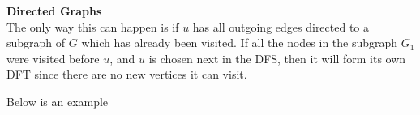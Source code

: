 \documentclass[11pt]{article}
\begin{document}
\begin{solution} \textbf{Directed Graphs}\\

The only way this can happen is if $u$ has all outgoing edges directed to a subgraph of $G$ which has already been visited. If all the nodes in the subgraph $G_1$ were visited before $u$, and $u$ is chosen next in the DFS, then it will form its own DFT since there are no new vertices it can visit. 


\hfil


Below is an example

\hfil


\begin{center}

\end{center}

	
\end{solution}
\end{document}
